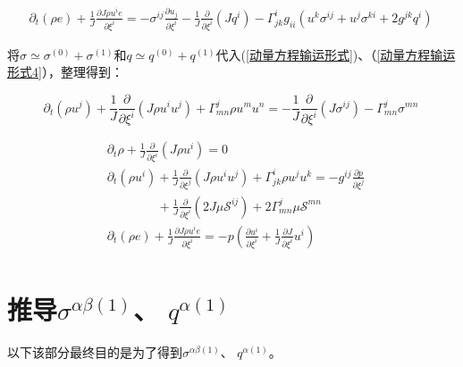 \documentclass[MathematicsNumericsDerivationsAndOpenFOAM.tex]{subfiles}
\begin{document}
\begin{equation}
  \begin{gathered}
    \boxed{
    \partial_{t}\left(\rho e\right) + \frac{1}{J}\frac{\partial J \rho u^i e}{\partial  \xi^{i}}  = -\sigma^{ij}  \frac{\partial  u_j}{\partial \xi^{i}}  - \frac{1}{J}\frac{\partial}{\partial \xi^{i}} (J q^{i})  - \Gamma^i_{j k}g_{ii}(u^k \sigma^{ij}+u^j \sigma^{ki}+ 2g^{jk}q^i)
    }
  \end{gathered}
  \label{动量方程输运形式4} ~
\end{equation}

将$\sigma\simeq \sigma^{(0)}+\sigma^{(1)}$和$q\simeq q^{(0)}+q^{(1)}$代入(\ref{动量方程输运形式})、（\ref{动量方程输运形式4}），整理得到：


\begin{equation}
  \boxed{
    \partial_{t}\left(\rho u^{j}\right)+\frac{1}{J} \frac{\partial}{\partial \xi^{i}}\left(J \rho u^{i} u^{j} \right)+\Gamma_{mn}^{j} \rho u^{m} u^{n} = - \frac{1}{J} \frac{\partial}{\partial \xi^{i}}\left(J \sigma^{ij} \right) -\Gamma_{mn}^{j} \sigma^{mn}
  }
  \label{动量方程输运形式} ~
\end{equation}
%

\begin{equation}
  \boxed{
    \begin{aligned}
       & \partial_{t} \rho+\frac{1}{J} \frac{\partial}{\partial \xi^{i}}\left(J \rho u^{i}\right)=0
      \\
       & \partial_{t}\left(\rho u^{i}\right)+\frac{1}{J} \frac{\partial}{\partial \xi^{j}}\left(J \rho u^{i} u^{j}\right)+\Gamma_{j k}^{i} \rho u^{j} u^{k}=-g^{i j} \frac{\partial p}{\partial \xi^{j}}  \\
       &\quad\quad\quad\quad + \frac{1}{J} \frac{\partial}{\partial \xi^i}(2J\mu \mathcal{S}^{ij}) + 2\Gamma_{mn}^j \mu \mathcal{S}^{mn} \\
       & \partial_{t}\left(\rho e\right) + \frac{1}{J}\frac{\partial J \rho u^i e}{\partial  \xi^{i}}  = -  p (\frac{\partial  u^i}{\partial \xi^{i}}  + \frac{1}{J} \frac{\partial J}{\partial \xi^i}u^i) \\
    \end{aligned}
  }
  \label{EQUATION::Eluer} ~
\end{equation}





\appendix
\chapter{推导$\sigma^{\alpha\beta(1)}$、 $q^{\alpha (1)}$}
以下该部分最终目的是为了得到$\sigma^{\alpha\beta(1)}$、 $q^{\alpha (1)}$。
\end{document}
